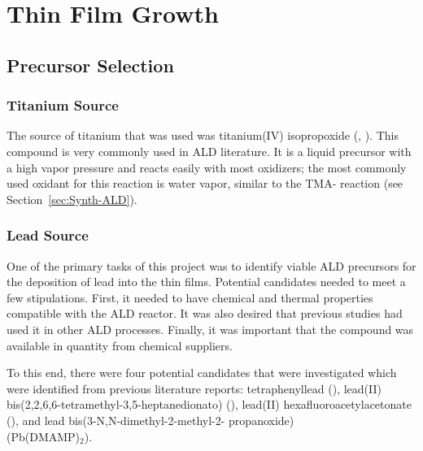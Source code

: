\chapter{Thin Film Growth}
\label{ch:SampFab}
\thispagestyle{empty}



\section{Precursor Selection}
\label{sec:SampFab-Precursors}

\lipsum

\subsection{Titanium Source}

The source of titanium that was used was titanium(IV) isopropoxide (\TiOiPr{}, ). This compound is very commonly used in ALD literature.\cite{cianci_atomic_2012,tallarida_growth_2011,lehnert_plasma_2012,cleveland_role_2012,kubrin_stacking_2012,lee_emph-situ_2012} It is a liquid precursor with a high vapor pressure and reacts easily with most oxidizers; the most commonly used oxidant for this reaction is water vapor, similar to the TMA- reaction (see Section~\vref{sec:Synth-ALD}). 

\subsection{Lead Source}

One of the primary tasks of this project was to identify viable ALD precursors for the deposition of lead into the thin films. Potential candidates needed to meet a few stipulations. First, it needed to have chemical and thermal properties compatible with the ALD reactor. It was also desired that previous studies had used it in other ALD processes. Finally, it was important that the compound was available in quantity from chemical suppliers. 

To this end, there were four potential candidates that were investigated which were identified from previous literature reports: tetraphenyllead ()\cite{harjuoja_2006}, lead(II) bis(2,2,6,6-tetramethyl-3,5-heptanedionato) ()\cite{watanabe_growth_2007}, lead(II) hexafluoroacetylacetonate ()\cite{Igumenov_1998}, and lead bis(3-N,N-dimethyl-2-methyl-2- propanoxide) \\\noindent(Pb(DMAMP)$_{2}$).\cite{Hwang_2007}

